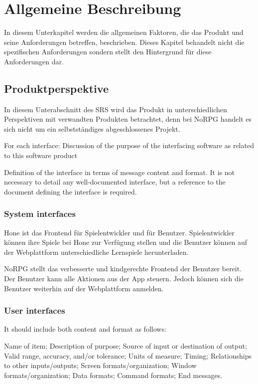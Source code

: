 \section{Allgemeine Beschreibung}
	In diesem Unterkapitel werden die allgemeinen Faktoren, die das Produkt und seine Anforderungen betreffen, beschrieben. Dieses Kapitel behandelt nicht die spezifischen Anforderungen sondern stellt den Hintergrund für diese Anforderungen dar. 

	\subsection{Produktperspektive}
		In diesem Unterabschnitt des SRS wird das Produkt in unterschiedlichen Perspektiven mit verwandten Produkten betrachtet, denn bei NoRPG handelt es sich nicht um ein selbstständiges abgeschlossenes Projekt.
		
		For each interface:
		Discussion of the purpose of the interfacing software as related to this software product
		
		Definition of the interface in terms of message content and format. It is not necessary to detail any well-documented interface, but a reference to the document defining the interface is required.
		
		\subsubsection{System interfaces}
			Hone ist das Frontend für Spielentwickler und für Benutzer. Spielentwickler können ihre Spiele bei Hone zur Verfügung stellen und die Benutzer können auf der Webplattform unterschiedliche Lernspiele herunterladen.
		
			NoRPG stellt das verbesserte und kindgerechte Frontend der Benutzer bereit. Der Benutzer kann alle Aktionen aus der App steuern. Jedoch können sich die Benutzer weiterhin auf der Webplattform anmelden. 
		
		\subsubsection{User interfaces}
			It should include both content and format as follows:
			
			Name of item; Description of purpose; Source of input or destination of output; Valid range, accuracy, and/or tolerance; Units of measure; Timing; Relationships to other inputs/outputs; Screen formats/organization; Window formats/organization; Data formats; Command formats; End messages.
		
